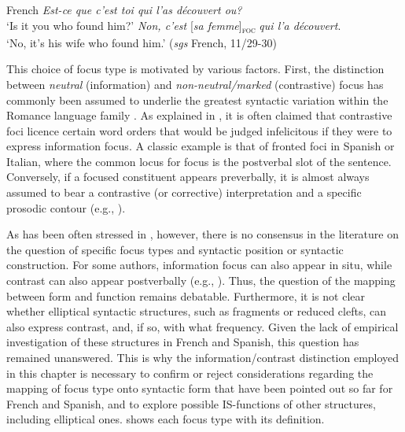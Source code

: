  \ea \label{ex:3:15} French
\ea 	\textit{Est-ce que c'est toi qui l'as découvert ou?}\\
 ‘Is it you who found him?'
\ex  \textit{Non, c'est} {[\textit{sa femme}]\textsubscript{\textsc{foc}}} \normalsize \textit{qui l'a découvert}.\\
‘No, it's his wife who found him.' \hfill (\textit{sgs} French, 11/29-30)    
\z \z 


This choice of focus type is motivated by various factors. First, the distinction between \textit{neutral} (information) and \textit{non-neutral/marked} (contrastive) focus has commonly been assumed to underlie the greatest syntactic variation within the Romance language family  \parencite{vidal2019nota, cruschina2021}. As explained in , it is often claimed that contrastive foci licence certain word orders that would be judged infelicitous if they were to express information focus. A classic example is that of fronted foci in Spanish or Italian, where the common locus for focus is the postverbal slot of the sentence. Conversely, if a focused constituent appears preverbally, it is almost always assumed to bear a contrastive (or corrective) interpretation and a specific prosodic contour (e.g., \cite{beninca1988ordine, bianchi2013focus, vidal2019nota}).

As has been often stressed in , however, there is no consensus in the literature on the question of specific focus types and syntactic position or syntactic construction. For some authors, information focus can also appear in situ, while contrast can also appear postverbally (e.g., \cite{gabriel2007fokus}). Thus, the question of the mapping between form and function remains debatable. Furthermore, it is not clear whether elliptical syntactic structures, such as fragments or reduced clefts, can also express contrast, and, if so, with what frequency. Given the lack of empirical investigation of these structures in French and Spanish, this question has remained unanswered. This is why the information/contrast distinction employed in this chapter is necessary to confirm or reject considerations regarding the mapping of focus type onto syntactic form that have been pointed out so far for French and Spanish, and to explore possible IS-functions of other structures, including elliptical ones.  shows each focus type with its definition.


